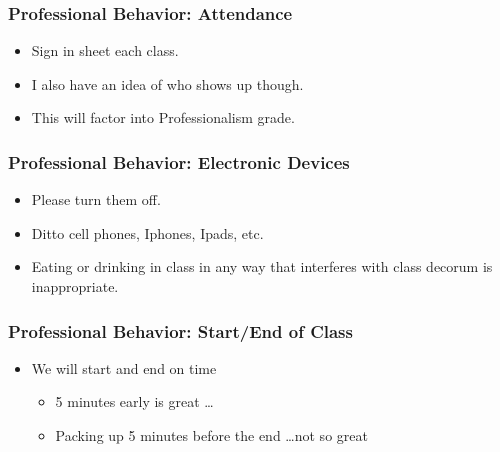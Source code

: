 \documentclass[9pt]{beamer}
\begin{document}

\begin{frame}[t]
\frametitle{Professional Behavior: Attendance}
\begin{itemize}
\item Sign in sheet each class. 
\bigskip
\item I also have an idea of who shows up though.
\bigskip
\item This will factor into Professionalism grade.
\end{itemize}
\end{frame}


\begin{frame}[t]
\frametitle{Professional Behavior: Electronic Devices}
\begin{itemize}
\item Please turn them off.
\bigskip
\item Ditto cell phones, Iphones, Ipads, etc.
\bigskip
\item Eating or drinking in class in any way that interferes with class decorum is inappropriate.
\end{itemize}
\end{frame}


\begin{frame}[t]
\frametitle{Professional Behavior: Start/End of Class}
\begin{itemize}
\item We will start and end on time
\begin{itemize}
\medskip
\item 5 minutes early is great \ldots
\medskip
\item Packing up 5 minutes before the end \ldots not so great
\end{itemize}
\end{itemize}
\end{frame}
\end{document}
